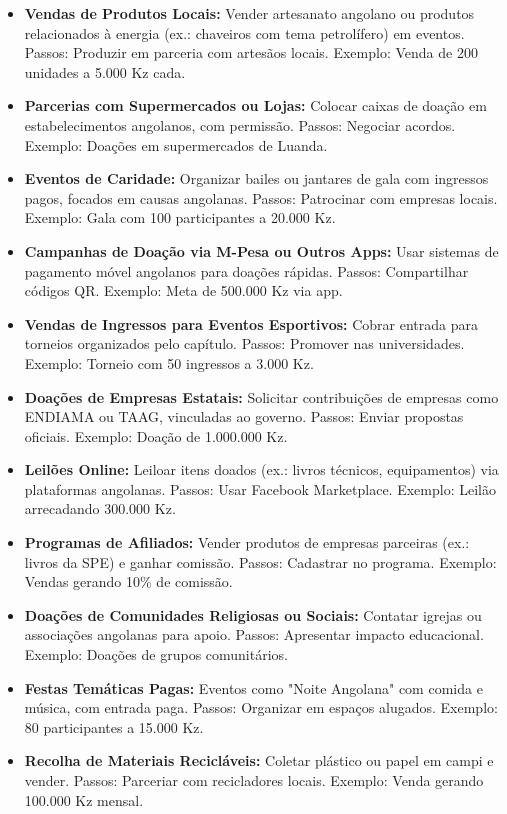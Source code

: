 \documentclass[12pt]{article}
\begin{document}
\begin{itemize}
    \item \textbf{Vendas de Produtos Locais:} Vender artesanato angolano ou produtos relacionados à energia (ex.: chaveiros com tema petrolífero) em eventos. Passos: Produzir em parceria com artesãos locais. Exemplo: Venda de 200 unidades a 5.000 Kz cada.
    \item \textbf{Parcerias com Supermercados ou Lojas:} Colocar caixas de doação em estabelecimentos angolanos, com permissão. Passos: Negociar acordos. Exemplo: Doações em supermercados de Luanda.
    \item \textbf{Eventos de Caridade:} Organizar bailes ou jantares de gala com ingressos pagos, focados em causas angolanas. Passos: Patrocinar com empresas locais. Exemplo: Gala com 100 participantes a 20.000 Kz.
    \item \textbf{Campanhas de Doação via M-Pesa ou Outros Apps:} Usar sistemas de pagamento móvel angolanos para doações rápidas. Passos: Compartilhar códigos QR. Exemplo: Meta de 500.000 Kz via app.
    \item \textbf{Vendas de Ingressos para Eventos Esportivos:} Cobrar entrada para torneios organizados pelo capítulo. Passos: Promover nas universidades. Exemplo: Torneio com 50 ingressos a 3.000 Kz.
    \item \textbf{Doações de Empresas Estatais:} Solicitar contribuições de empresas como ENDIAMA ou TAAG, vinculadas ao governo. Passos: Enviar propostas oficiais. Exemplo: Doação de 1.000.000 Kz.
    \item \textbf{Leilões Online:} Leiloar itens doados (ex.: livros técnicos, equipamentos) via plataformas angolanas. Passos: Usar Facebook Marketplace. Exemplo: Leilão arrecadando 300.000 Kz.
    \item \textbf{Programas de Afiliados:} Vender produtos de empresas parceiras (ex.: livros da SPE) e ganhar comissão. Passos: Cadastrar no programa. Exemplo: Vendas gerando 10\% de comissão.
    \item \textbf{Doações de Comunidades Religiosas ou Sociais:} Contatar igrejas ou associações angolanas para apoio. Passos: Apresentar impacto educacional. Exemplo: Doações de grupos comunitários.
    \item \textbf{Festas Temáticas Pagas:} Eventos como "Noite Angolana" com comida e música, com entrada paga. Passos: Organizar em espaços alugados. Exemplo: 80 participantes a 15.000 Kz.
    \item \textbf{Recolha de Materiais Recicláveis:} Coletar plástico ou papel em campi e vender. Passos: Parceriar com recicladores locais. Exemplo: Venda gerando 100.000 Kz mensal.

\end{itemize}
\end{document}
